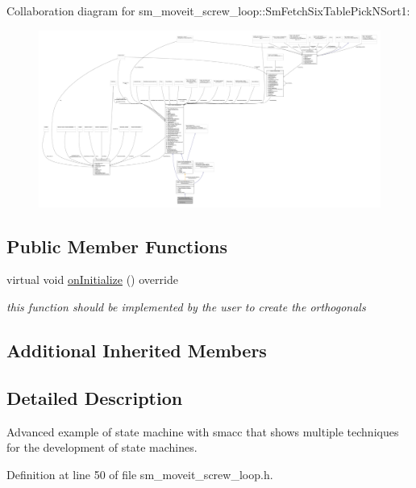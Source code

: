Collaboration diagram for sm\+\_\+moveit\+\_\+screw\+\_\+loop\+:\+:Sm\+Fetch\+Six\+Table\+Pick\+N\+Sort1\+:
\nopagebreak
\begin{figure}[H]
\begin{center}
\leavevmode
\includegraphics[width=350pt]{structsm__moveit__screw__loop_1_1SmFetchSixTablePickNSort1__coll__graph}
\end{center}
\end{figure}
\subsection*{Public Member Functions}
\begin{DoxyCompactItemize}
\item 
virtual void \hyperlink{structsm__moveit__screw__loop_1_1SmFetchSixTablePickNSort1_a1d6d736d4261244a85c293b53ccce2c4}{on\+Initialize} () override
\begin{DoxyCompactList}\small\item\em this function should be implemented by the user to create the orthogonals \end{DoxyCompactList}\end{DoxyCompactItemize}
\subsection*{Additional Inherited Members}


\subsection{Detailed Description}
Advanced example of state machine with smacc that shows multiple techniques for the development of state machines. 

Definition at line 50 of file sm\+\_\+moveit\+\_\+screw\+\_\+loop.\+h.



